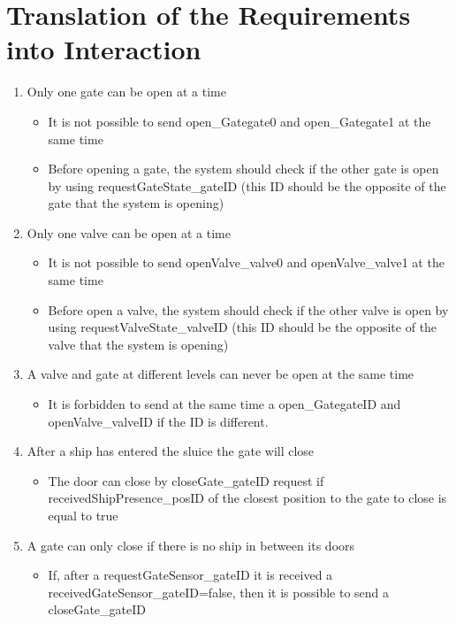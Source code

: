 \section{Translation of the Requirements into Interaction}
\begin{enumerate}
	\item Only one gate can be open at a time
	
		\begin{itemize}
			\item It is not possible to send open\_Gategate0 and open\_Gategate1 at the same time
			\item Before opening a gate, the system should check if the other gate is open by using requestGateState\_gateID (this ID should be the opposite of the gate that the system is opening)
		\end{itemize}
	
	\item Only one valve can be open at a time
	
		\begin{itemize}
			\item It is not possible to send openValve\_valve0 and openValve\_valve1 at the same time
			\item Before open a valve, the system should check if the other valve is open by using requestValveState\_valveID (this ID should be the opposite of the valve that the system is opening)
		\end{itemize}
	
	\item A valve and gate at different levels can never be open at the same time
		\begin{itemize}
			\item It is forbidden to send at the same time a open\_GategateID and openValve\_valveID if the ID is different.
		\end{itemize}
	
	\item After a ship has entered the sluice the gate will close
	\begin{itemize}
		\item The door can close by closeGate\_gateID request if receivedShipPresence\_posID of the closest position to the gate to close is equal to true
		
	\end{itemize}
	\item A gate can only close if there is no ship in between its doors
	\begin{itemize}
		\item If, after a requestGateSensor\_gateID it is received a receivedGateSensor\_gateID=false, then it is possible to send a closeGate\_gateID
		

\end{itemize}
\end{enumerate}
